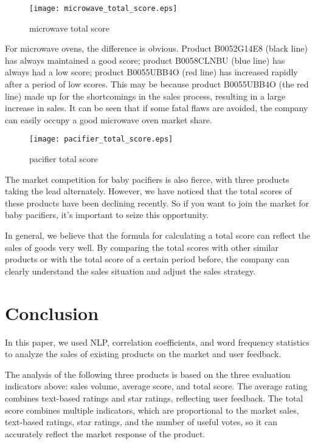 \documentclass{mcmthesis}
\begin{document}
	\begin{figure}[H]
		\small
		\centering
		\texttt{[image: microwave\_total\_score.eps]}
		\caption{microwave total score} \label{fig:microwave total score}
	\end{figure}
	
	For microwave ovens, the difference is obvious. Product B0052G14E8 (black line) has always maintained a good score; product B0058CLNBU (blue line) has always had a low score; product B0055UBB4O (red line) has increased rapidly after a period of low scores. This may be because product B0055UBB4O (the red line) made up for the shortcomings in the sales process, resulting in a large increase in sales. It can be seen that if some fatal flaws are avoided, the company can easily occupy a good microwave oven market share.
	
	\begin{figure}[H]
		\small
		\centering
		\texttt{[image: pacifier\_total\_score.eps]}
		\caption{pacifier total score} \label{fig:pacifier total score}
	\end{figure}
	
	The market competition for baby pacifiers is also fierce, with three products taking the lead alternately. However, we have noticed that the total scores of these products have been declining recently. So if you want to join the market for baby pacifiers, it's important to seize this opportunity.
	
	In general, we believe that the formula for calculating a total score can reflect the sales of goods very well. By comparing the total scores with other similar products or with the total score of a certain period before, the company can clearly understand the sales situation and adjust the sales strategy.
	
	
	\section{Conclusion}
	
	In this paper, we used NLP, correlation coefficients, and word frequency statistics to analyze the sales of existing products on the market and user feedback.
	
	The analysis of the following three products is based on the three evaluation indicators above: sales volume, average score, and total score. The average rating combines text-based ratings and star ratings, reflecting user feedback. The total score combines multiple indicators, which are proportional to the market sales, text-based ratings, star ratings, and the number of useful votes, so it can accurately reflect the market response of the product.
	
\end{document}
